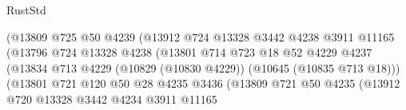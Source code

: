 \begin{lexlean}{RustStd}
\begin{coremodule}
                                            (@13809
                                              @725
                                              @50
                                              @4239
                                              (@13912
                                                @724
                                                @13328
                                                @3442
                                                @4238
                                                @3911
                                                @11165
                                                (@13796
                                                  @724
                                                  @13328
                                                  @4238
                                                  (@13801
                                                    @714
                                                    @723
                                                    @18
                                                    @52
                                                    @4229
                                                    @4237
                                                    (@13834
                                                      @713
                                                      @4229
                                                      (@10829 (@10830 @4229))
                                                      (@10645 (@10835 @713 @18)))
                                                    (@13801
                                                      @721
                                                      @120
                                                      @50
                                                      @28
                                                      @4235
                                                      @3436
                                                      (@13809
                                                        @721
                                                        @50
                                                        @4235
                                                        (@13912
                                                          @720
                                                          @13328
                                                          @3442
                                                          @4234
                                                          @3911
                                                          @11165

\end{coremodule}
\end{lexlean}
